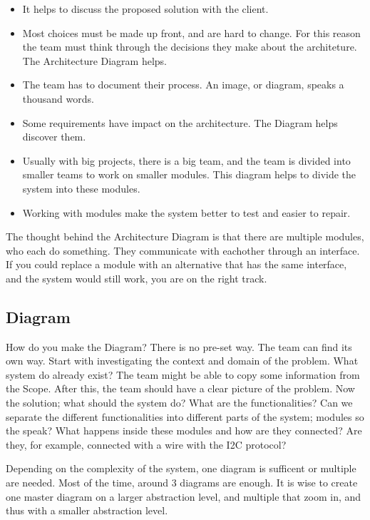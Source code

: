 \documentclass[10pt]{report}
\begin{document}
\begin{itemize}
	\item It helps to discuss the proposed solution with the client.
	\item Most choices must be made up front, and are hard to change. For this reason the team must think through the decisions they make about the architeture. The Architecture Diagram helps.
	\item The team has to document their process. An image, or diagram, speaks a thousand words.
	\item Some requirements have impact on the architecture. The Diagram helps discover them.
	\item Usually with big projects, there is a big team, and the team is divided into smaller teams to work on smaller modules. This diagram helps to divide the system into these modules.
	\item Working with modules make the system better to test and easier to repair.
\end{itemize}

The thought behind the Architecture Diagram is that there are multiple modules, who each do something. They communicate with eachother through an interface. If you could replace a module with an alternative that has the same interface, and the system would still work, you are on the right track.

\subsection{Diagram}

How do you make the Diagram? There is no pre-set way. The team can find its own way. Start with investigating the context and domain of the problem. What system do already exist? The team might be able to copy some information from the Scope. After this, the team should have a clear picture of the problem. Now the solution; what should the system do? What are the functionalities? Can we separate the different functionalities into different parts of the system; modules so the speak? What happens inside these modules and how are they connected? Are they, for example, connected with a wire with the I2C protocol?

Depending on the complexity of the system, one diagram is sufficent or multiple are needed. Most of the time, around 3 diagrams are enough. It is wise to create one master diagram on a larger abstraction level, and multiple that zoom in, and thus with a smaller abstraction level.
\end{document}
